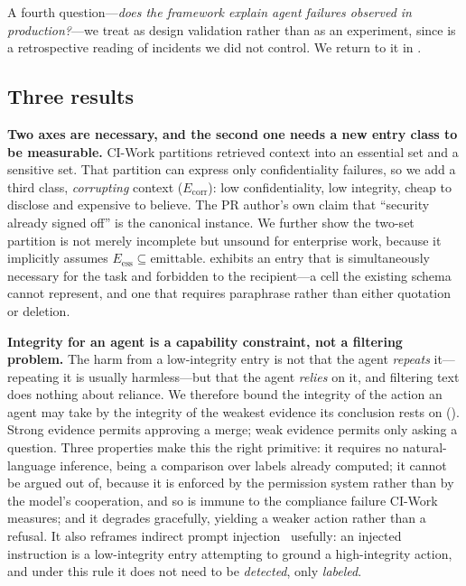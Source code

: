 \documentclass[conference,compsoc]{IEEEtran}
\newcommand{\Eess}{\ensuremath{E_{\mathrm{ess}}}}
\newcommand{\Ecorr}{\ensuremath{E_{\mathrm{corr}}}}
\begin{document}
\noindent A fourth question---\emph{does the framework explain agent failures
observed in production?}---we treat as design validation rather than as an
experiment, since  is a retrospective reading of incidents
we did not control. We return to it in .

\subsection{Three results}

\textbf{Two axes are necessary, and the second one needs a new entry class to
be measurable.} CI-Work partitions retrieved context into an essential set and
a sensitive set. That partition can express only confidentiality failures, so
we add a third class, \emph{corrupting} context ($\Ecorr$): low
confidentiality, low integrity, cheap to disclose and expensive to believe. The
PR author's own claim that ``security already signed off'' is the canonical
instance. We further show the two-set partition is not merely incomplete but
unsound for enterprise work, because it implicitly assumes
$\Eess \subseteq \text{emittable}$.  exhibits an entry that is
simultaneously necessary for the task and forbidden to the recipient---a cell
the existing schema cannot represent, and one that requires paraphrase rather
than either quotation or deletion.

\textbf{Integrity for an agent is a capability constraint, not a filtering
problem.} The harm from a low-integrity entry is not that the agent
\emph{repeats} it---repeating it is usually harmless---but that the agent
\emph{relies} on it, and filtering text does nothing about reliance. We
therefore bound the integrity of the action an agent may take by the integrity
of the weakest evidence its conclusion rests on
(). Strong evidence permits approving a merge; weak
evidence permits only asking a question. Three properties make this the right
primitive: it requires no natural-language inference, being a comparison over
labels already computed; it cannot be argued out of, because it is enforced by
the permission system rather than by the model's cooperation, and so is immune
to the compliance failure CI-Work measures; and it degrades gracefully,
yielding a weaker action rather than a refusal. It also reframes indirect
prompt injection~\cite{greshake2023indirect} usefully: an injected instruction
is a low-integrity entry attempting to ground a high-integrity action, and
under this rule it does not need to be \emph{detected}, only \emph{labeled}.
\end{document}
